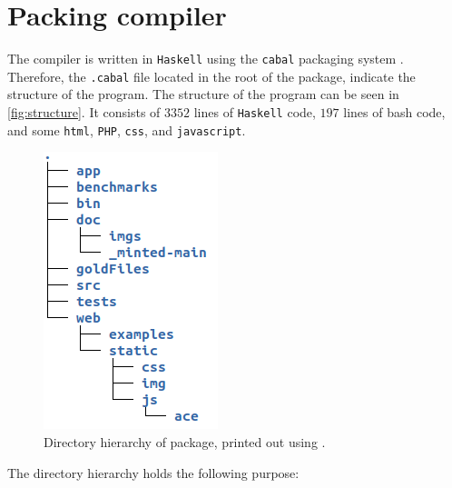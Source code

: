 \section{Packing compiler }
The \lan compiler is written in \texttt{Haskell} using the \texttt{cabal} packaging system
\cite{cabal}. Therefore, the \texttt{.cabal} file located in the root of the package, indicate
the structure of the program. The structure of the program can be seen in
\autoref{fig:structure}. It consists of $3352$ lines of \texttt{Haskell} code, $197$ lines of
bash code, and some \texttt{html}, \texttt{PHP}, \texttt{css}, and \texttt{javascript}.

\begin{figure}[H]
    \centering
    \includegraphics[scale=0.7]{imgs/directory-structure.png}
    \caption{Directory hierarchy of \lan package, printed out using .}
    \label{fig:structure}
\end{figure}
\noindent
The directory hierarchy holds the following purpose:

